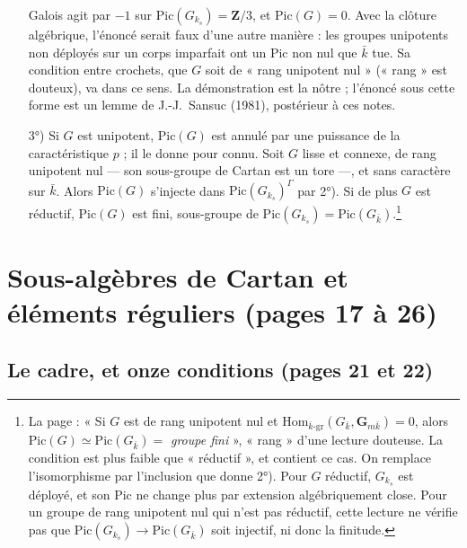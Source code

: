 \documentclass[11pt,a4paper]{article}
\begin{document}
\begin{enumerate}
{Galois agit par $-1$ sur $\mathrm{Pic}(G_{k_{s}}) = \mathbf{Z}/3$, et
$\mathrm{Pic}(G) = 0$. Avec la clôture algébrique, l'énoncé serait faux
d'une autre manière : les groupes unipotents non déployés sur un corps
imparfait ont un $\mathrm{Pic}$ non nul que $\bar k$ tue. Sa condition
entre crochets, que $G$ soit de « rang unipotent nul » (« rang » est
douteux), va dans ce sens. La
démonstration est la nôtre ; l'énoncé sous cette forme est un lemme de
J.-J.~Sansuc (1981), postérieur à ces notes.}
\item[3°)] Si $G$ est unipotent, $\mathrm{Pic}(G)$ est annulé par une
puissance de la caractéristique $p$ ; il le donne pour connu. Soit $G$ lisse
et connexe, de rang unipotent nul --- son sous-groupe de Cartan est un tore
---, et sans caractère sur $\bar k$. Alors $\mathrm{Pic}(G)$ s'injecte dans
$\mathrm{Pic}(G_{k_{s}})^{\Gamma}$ par 2°). Si de plus $G$ est réductif,
$\mathrm{Pic}(G)$ est fini, sous-groupe de $\mathrm{Pic}(G_{k_{s}}) =
\mathrm{Pic}(G_{\bar k})$.\footnote{La page : « Si $G$ est de rang unipotent
nul et $\mathrm{Hom}_{\bar k\text{-gr}}(G_{\bar k}, \mathbf{G}_{m\bar k}) =
0$, alors $\mathrm{Pic}(G) \simeq \mathrm{Pic}(G_{\bar k}) =$ \emph{groupe
fini} », « rang » d'une lecture douteuse. La condition est plus faible que
« réductif », et contient ce cas. On remplace l'isomorphisme par
l'inclusion que donne 2°). Pour $G$ réductif, $G_{k_{s}}$ est déployé, et son
$\mathrm{Pic}$ ne change plus par extension algébriquement close. Pour un
groupe de rang unipotent nul qui n'est pas réductif, cette lecture ne
vérifie pas que $\mathrm{Pic}(G_{k_{s}}) \to \mathrm{Pic}(G_{\bar k})$ soit
injectif, ni donc la finitude.}
\end{enumerate}

\section*{Sous-algèbres de Cartan et éléments réguliers (pages 17 à 26)}

\subsection*{Le cadre, et onze conditions (pages 21 et 22)}
\end{document}
